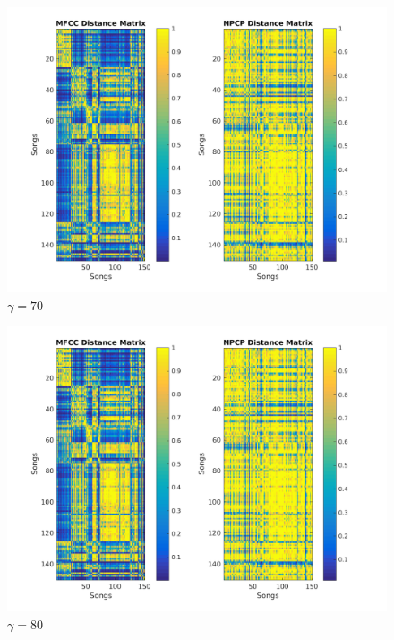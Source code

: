 \documentclass[11pt, a4paper]{article}
\begin{document}
\begin{figure}[H]
\hspace*{-2cm}    
    \centering
    \includegraphics[width=1.25\textwidth]{gamma70.png}
    \caption{$\gamma = 70$}
\end{figure}

\begin{figure}[H]
\hspace*{-2cm}    
    \centering
    \includegraphics[width=1.25\textwidth]{gamma80.png}
    \caption{$\gamma = 80$}
\end{figure}
\end{document}
